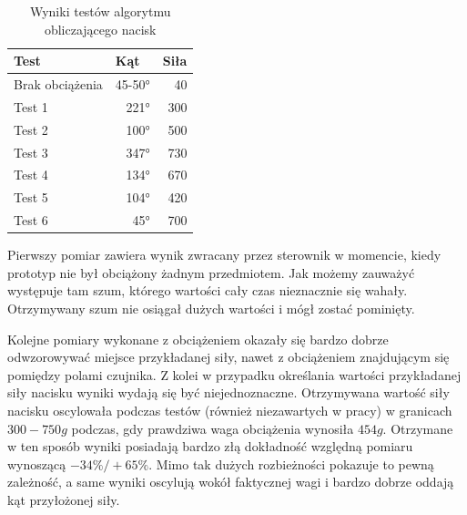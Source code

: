 \begin{table}[!h]
\centering
\caption{Wyniki testów algorytmu obliczającego nacisk}
\begin{tabular}{|l|r|r|}
\hline
Test   & \multicolumn{1}{l|}{Kąt} & \multicolumn{1}{l|}{Siła} \\ \hline
Brak obciążenia   & 45-50°                   & 40                        \\ \hline
Test 1 & 221°                     & 300                       \\ \hline
Test 2 & 100°                     & 500                       \\ \hline
Test 3 & 347°                     & 730                       \\ \hline
Test 4 & 134°                     & 670                       \\ \hline
Test 5 & 104°                     & 420                       \\ \hline
Test 6 & 45°                      & 700                       \\ \hline
\end{tabular}
\label{t_badanie0_wyniki}
\end{table}

Pierwszy pomiar zawiera wynik zwracany przez sterownik w momencie, kiedy prototyp nie był obciążony żadnym przedmiotem. Jak możemy zauważyć występuje tam szum, którego wartości cały czas nieznacznie się wahały. Otrzymywany szum nie osiągał dużych wartości i mógł zostać pominięty.

Kolejne pomiary wykonane z obciążeniem okazały się bardzo dobrze odwzorowywać miejsce przykładanej siły, nawet z obciążeniem znajdującym się pomiędzy polami czujnika. Z kolei w przypadku określania wartości przykładanej siły nacisku wyniki wydają się być niejednoznaczne. Otrzymywana wartość siły nacisku oscylowała podczas testów (również niezawartych w pracy) w granicach $300 - 750 g$ podczas, gdy prawdziwa waga obciążenia wynosiła $454 g$. Otrzymane w ten sposób wyniki posiadają bardzo złą dokładność względną pomiaru wynoszącą $-34\%/+65\%$. Mimo tak dużych rozbieżności pokazuje to pewną zależność, a same wyniki oscylują wokół faktycznej wagi i bardzo dobrze oddają kąt przyłożonej siły.


